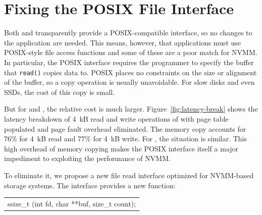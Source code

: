 \section{Fixing the POSIX File Interface}
\label{sec:noposix}

Both \DAChell{} and \CChell{} transparently provide a POSIX-compatible
interface, so no changes to the application are needed.  This means, however, that applications must use POSIX-style file access functions and some of these are a poor match for NVMM.
In particular, the POSIX interface
requires the programmer to specify the buffer that \texttt{read()} copies data to.
POSIX places no constraints on the size
or alignment of the buffer, so a copy operation is usually unavoidable.  For
slow disks and even SSDs, the cost of this copy is small.


But for \DAChell{} and \CChell{}, the relative cost is much larger.
Figure~\ref{fig:latency-break} shows the latency breakdown of 4~kB read and
write operations of \DAChell{} with page table populated and page fault overhead
eliminated.  The memory copy accounts for 76\% for 4~kB
read and 77\% for 4~kB write. For \CChell{}, the situation is similar.
This high overhead of memory copying makes the POSIX interface
itself a major impediment to exploiting the performance of NVMM.

To eliminate it, we propose a new file read interface optimized for
NVMM-based storage systems.  The interface provides a new function:

\vspace{1em}
\begin{tabular}{l}
ssize\_t \grb{}(int fd, char **buf, size\_t count);\\
\end{tabular}
\vspace{1em}


